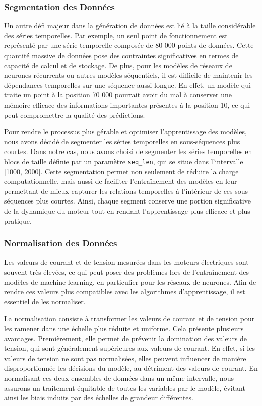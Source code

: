\subsubsection{Segmentation des Données}
Un autre défi majeur dans la génération de données est lié à la taille
considérable des séries temporelles. Par exemple, un seul point de
fonctionnement est représenté par une série temporelle composée de 80 000
points de données. Cette quantité massive de données pose des contraintes
significatives en termes de capacité de calcul et de stockage. De plus, pour
les modèles de réseaux de neurones récurrents ou autres modèles séquentiels, il
est difficile de maintenir les dépendances temporelles sur une séquence aussi
longue. En effet, un modèle qui traite un point à la position 70 000 pourrait
avoir du mal à conserver une mémoire efficace des informations importantes
présentes à la position 10, ce qui peut compromettre la qualité des
prédictions.

Pour rendre le processus plus gérable et optimiser l'apprentissage des modèles,
nous avons décidé de segmenter les séries temporelles en sous-séquences plus
courtes. Dans notre cas, nous avons choisi de segmenter les séries temporelles
en blocs de taille définie par un paramètre \texttt{seq\_len}, qui se situe
dans l'intervalle [1000, 2000]. Cette segmentation permet non seulement de
réduire la charge computationnelle, mais aussi de faciliter l'entraînement des
modèles en leur permettant de mieux capturer les relations temporelles à
l'intérieur de ces sous-séquences plus courtes. Ainsi, chaque segment conserve
une portion significative de la dynamique du moteur tout en rendant
l'apprentissage plus efficace et plus pratique.

\subsubsection{Normalisation des Données}

Les valeurs de courant et de tension mesurées dans les moteurs électriques sont
souvent très élevées, ce qui peut poser des problèmes lors de l'entraînement
des modèles de machine learning, en particulier pour les réseaux de neurones.
Afin de rendre ces valeurs plus compatibles avec les algorithmes
d'apprentissage, il est essentiel de les normaliser.

La normalisation consiste à transformer les valeurs de courant et de tension
pour les ramener dans une échelle plus réduite et uniforme. Cela présente
plusieurs avantages. Premièrement, elle permet de prévenir la domination des
valeurs de tension, qui sont généralement supérieures aux valeurs de courant.
En effet, si les valeurs de tension ne sont pas normalisées, elles peuvent
influencer de manière disproportionnée les décisions du modèle, au détriment
des valeurs de courant. En normalisant ces deux ensembles de données dans un
même intervalle, nous assurons un traitement équitable de toutes les variables
par le modèle, évitant ainsi les biais induits par des échelles de grandeur
différentes.

